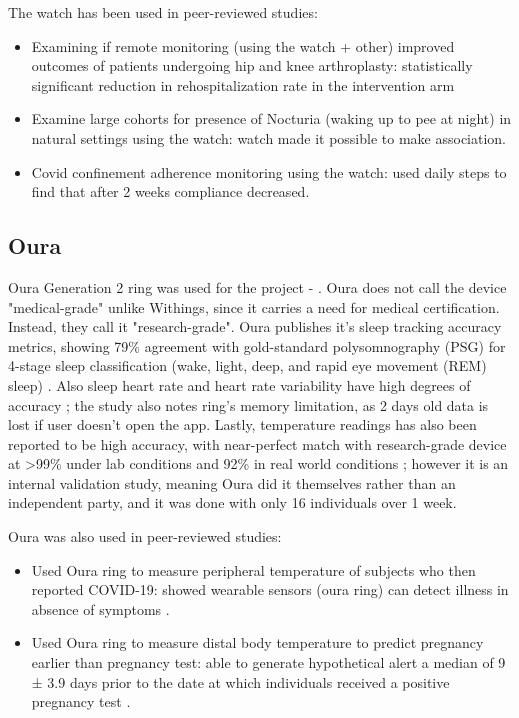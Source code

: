 The watch has been used in peer-reviewed studies:
\begin{itemize}
    \item Examining if remote monitoring (using the watch + other) improved outcomes of patients undergoing hip and knee arthroplasty: statistically significant reduction in rehospitalization rate in the intervention arm \cite{withingsHospitalization}
    \item Examine large cohorts for presence of Nocturia (waking up to pee at night) in natural settings using the watch: watch made it possible to make association. \cite{withingsNocturia}
    \item Covid confinement adherence monitoring using the watch: used daily steps to find that after 2 weeks compliance decreased. \cite{withingsCovidConfinement}
\end{itemize}


\subsection{Oura}
\label{section:OuraRing}
Oura Generation 2 ring was used for the project - \cite{ouraStorePage}. Oura does not call the device "medical-grade" unlike Withings, since it carries a need for medical certification. Instead, they call it "research-grade". Oura publishes it's sleep tracking accuracy metrics, showing 79\% agreement with gold-standard polysomnography (PSG) for 4-stage sleep classification (wake, light, deep, and rapid eye movement (REM) sleep) \cite{OuraSleepAcc}. Also sleep heart rate and heart rate variability have high degrees of accuracy \cite{ouraHeartAcc}; the study also notes ring's memory limitation, as 2 days old data is lost if user doesn't open the app. Lastly, temperature readings has also been reported to be high accuracy, with near-perfect match with research-grade device at >99\% under lab conditions and 92\% in real world conditions \cite{ouraTemp}; however it is an internal validation study, meaning Oura did it themselves rather than an independent party, and it was done with only 16 individuals over 1 week.

Oura was also used in peer-reviewed studies:
\begin{itemize}
    \item Used Oura ring to measure peripheral temperature of subjects who then reported COVID-19: showed wearable sensors (oura ring) can detect illness in absence of symptoms \cite{smarr2020feasibility}.
    \item Used Oura ring to measure distal body temperature to predict pregnancy earlier than pregnancy test: able to generate hypothetical alert a median of 9 ± 3.9 days prior to the date at which individuals received a positive pregnancy test \cite{ouraPregnancy}.
\end{itemize}
